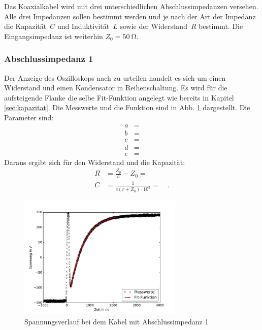 Das Koaxialkabel wird mit drei unterschiedlichen Abschlussimpedanzen versehen. Alle drei Impedanzen sollen bestimmt werden und je nach der Art der Impedanz die Kapazität~$C$ und Induktivität~$L$ sowie der Widerstand~$R$ bestimmt. Die Eingangsimpedanz ist weiterhin $Z_0 = \SI{50}{\ohm}$.

\subsubsection{Abschlussimpedanz 1}
Der Anzeige des Oszilloskops nach zu urteilen handelt es sich um einen Widerstand und einen Kondensator in Reihenschaltung. Es wird für die aufsteigende Flanke die selbe Fit-Funktion angelegt wie bereits in Kapitel \ref{sec:kapazitat}. Die Messwerte und die Funktion sind in Abb. \ref{fig:box25} dargestellt. Die Parameter sind:
\begin{align}
	a &=  \\
	b &=  \\
	c &=  \\
	d &=  \\
	e &=  
\end{align}
Daraus ergibt sich für den Widerstand und die Kapazität:
\begin{align}
	R &= \frac{Z_0}{b} - Z_0 =  \\
	C &= \frac{1}{ c (r + Z_0) \cdot 10^9} =  \quad.
\end{align}


\begin{figure}
	\centering
	\includegraphics[width=0.7\textwidth]{Box25/Box25.pdf}
	\caption{Spannungsverlauf bei dem Kabel mit Abschlussimpedanz 1}
	\label{fig:box25}
\end{figure}
\clearpage
